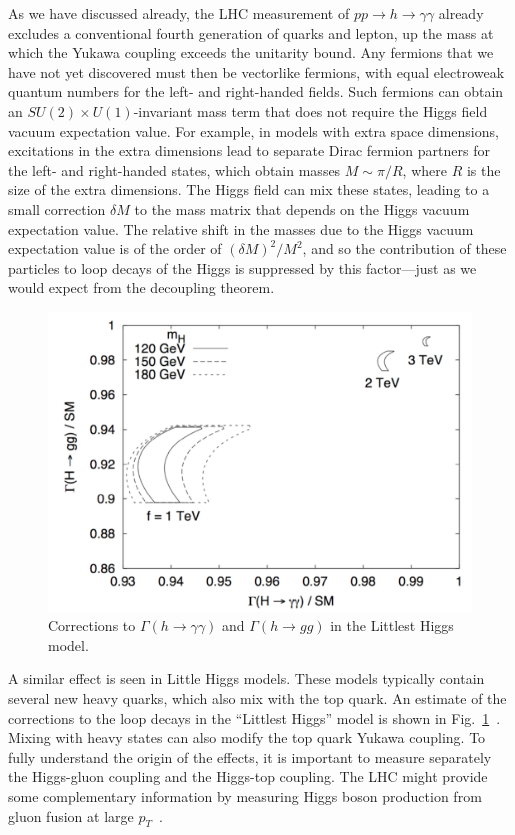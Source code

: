 \documentclass[12pt]{article}
\begin{document}
  As
we have discussed already,  the LHC measurement of $pp\to h\to
\gamma\gamma$ 
already excludes
a conventional fourth generation of quarks and lepton, up the mass at
which the Yukawa coupling exceeds the unitarity bound.   Any fermions
that we have not yet discovered must then be vectorlike fermions,  with
equal
electroweak quantum numbers for the left- and right-handed fields.
Such fermions
can obtain an $SU(2)\times U(1)$-invariant mass term that does not
require the Higgs field vacuum expectation value.
For example, in models with extra space dimensions, excitations in the
extra dimensions lead to separate Dirac fermion partners for the left- and
right-handed states, which obtain masses $M \sim \pi/R$, where $R$ is
the size of the 
extra dimensions.   The Higgs field can mix these states, leading to a
small correction $\delta M$ to the  mass matrix that depends 
on the Higgs vacuum
expectation value.  The relative shift in the masses due to the Higgs vacuum
expectation value is of the order of  $(\delta M)^2/M^2$, and so the
contribution of these particles to loop decays of the Higgs is
suppressed by this factor---just as we would expect from the
decoupling theorem.

\begin{figure}
\begin{center}
\includegraphics[width=0.70\hsize]{Littlest.pdf}
\end{center}
\caption{Corrections to $\Gamma(h\to \gamma\gamma)$ and $\Gamma(h\to
  gg)$ in the Littlest Higgs model.}
\label{fig:Littlest}
\end{figure}


A similar effect is seen in Little Higgs models.   These models
typically contain several new heavy quarks, which also mix with the
top quark.  An estimate of the corrections to the loop decays in the
``Littlest
Higgs'' model is shown in
Fig.~\ref{fig:Littlest}~\cite{HanLittleHiggs}.   Mixing with heavy
states can also modify the top quark Yukawa coupling.   To fully
understand the origin of the effects, it is important to measure separately
the Higgs-gluon coupling and the Higgs-top coupling.   The LHC might
provide some complementary information by measuring Higgs boson
production  from
gluon fusion  at large $p_T$~\cite{GrojeanHiggsatlargepT}. 
\end{document}
